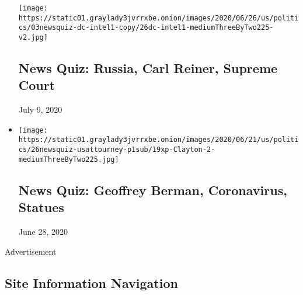 \begin{itemize}
  \texttt{[image: https://static01.graylady3jvrrxbe.onion/images/2020/06/26/us/politics/03newsquiz-dc-intel1-copy/26dc-intel1-mediumThreeByTwo225-v2.jpg]}

  \hypertarget{news-quiz-russia-carl-reiner-supreme-court}{%
  \subsection{News Quiz: Russia, Carl Reiner, Supreme
  Court}\label{news-quiz-russia-carl-reiner-supreme-court}}

  July 9, 2020
\item
  \href{https://www.nytimes3xbfgragh.onion/interactive/2020/06/26/briefing/geoffrey-berman-coronavirus-statues-news-quiz.html}{}

  \texttt{[image: https://static01.graylady3jvrrxbe.onion/images/2020/06/21/us/politics/26newsquiz-usattourney-p1sub/19xp-Clayton-2-mediumThreeByTwo225.jpg]}

  \hypertarget{news-quiz-geoffrey-berman-coronavirus-statues}{%
  \subsection{News Quiz: Geoffrey Berman, Coronavirus,
  Statues}\label{news-quiz-geoffrey-berman-coronavirus-statues}}

  June 28, 2020
\end{itemize}

Advertisement

\hypertarget{site-information-navigation}{%
\subsection{Site Information
Navigation}\label{site-information-navigation}}

